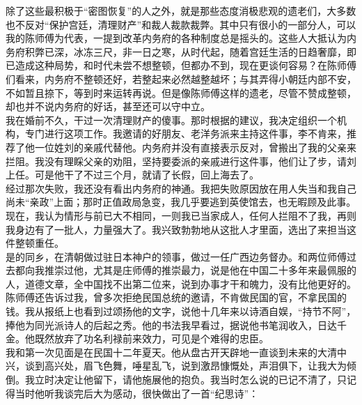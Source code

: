 除了这些最积极于“密图恢复”的人之外，就是那些态度消极悲观的遗老们，大多数也不反对“保护宫廷，清理财产”和裁人裁款裁弊。其中只有很小的一部分人，可以我的陈师傅为代表，一提到改革内务府的各种制度总是摇头的。这些人大抵认为内务府积弊已深，冰冻三尺，非一日之寒，从时代起，随着宫廷生活的日趋奢靡，即已造成这种局势，和时代未尝不想整顿，但都办不到，现在更谈何容易？在陈师傅们看来，内务府不整顿还好，若整起来必然越整越坏；与其弄得小朝廷内部不安，不如暂且捺下，等到时来运转再说。但是像陈师傅这样的遗老，尽管不赞成整顿，却也并不说内务府的好话，甚至还可以守中立。\\

我在婚前不久，干过一次清理财产的傻事。那时根据的建议，我决定组织一个机构，专门进行这项工作。我邀请的好朋友、老洋务派来主持这件事，李不肯来，推荐了他一位姓刘的亲戚代替他。内务府并没有直接表示反对，曾搬出了我的父亲来拦阻。我没有理睬父亲的劝阻，坚持要委派的亲戚进行这件事，他们让了步，请刘上任。可是他干了不过三个月，就请了长假，回上海去了。\\

经过那次失败，我还没有看出内务府的神通。我把失败原因放在用人失当和我自己尚未“亲政”上面；那时正值政局急变，我几乎要逃到英使馆去，也无暇顾及此事。现在，我认为情形与前已大不相同，一则我已当家成人，任何人拦阻不了我，再则我身边有了一批人，力量强大了。我兴致勃勃地从这批人才里面，选出了来担当这件整顿重任。\\

是的同乡，在清朝做过驻日本神户的领事，做过一任广西边务督办。和两位师傅过去都向我推崇过他，尤其是庄师傅的推崇最力，说是他在中国二十多年来最佩服的人，道德文章，全中国找不出第二位来，说到办事才干和魄力，没有比他更好的。陈师傅还告诉过我，曾多次拒绝民国总统的邀请，不肯做民国的官，不拿民国的钱。我从报纸上也看到过颂扬他的文字，说他十几年来以诗酒自娱，“持节不阿”，捧他为同光派诗人的后起之秀。他的书法我早看过，据说他书笔润收入，日达千金。他既然放弃了功名利禄前来效力，可见是个难得的忠臣。\\

我和第一次见面是在民国十二年夏天。他从盘古开天辟地一直谈到未来的大清中兴，谈到高兴处，眉飞色舞，唾星乱飞，说到激昂慷慨处，声泪俱下，让我大为倾倒。我立时决定让他留下，请他施展他的抱负。我当时怎么说的已记不清了，只记得当时他听我谈完后大为感动，很快做出了一首“纪思诗”：\\

